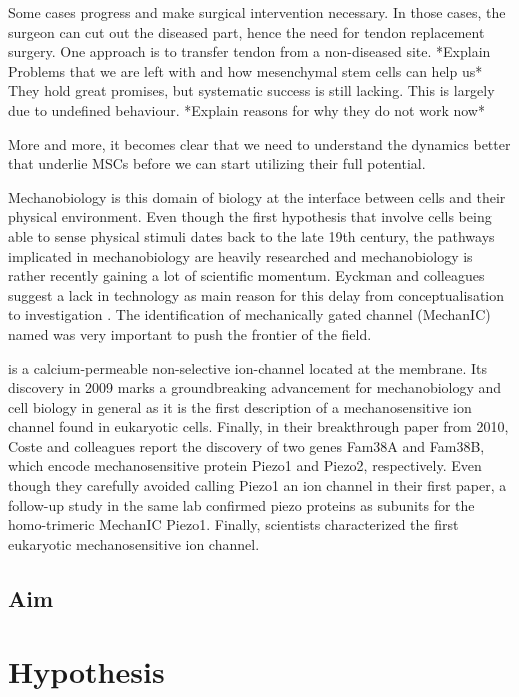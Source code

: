 Some cases progress and make surgical intervention necessary. In those cases, the surgeon can cut out the diseased part, hence the need for tendon replacement surgery.  One approach is to transfer tendon from a non-diseased site. *Explain Problems that we are left with and how mesenchymal stem cells can help us* They hold great promises, but systematic success is still lacking. This is largely due to undefined behaviour. *Explain reasons for why they do not work now* 

More and more, it becomes clear that we need to understand the dynamics better that underlie MSCs before we can start utilizing their full potential.\par 

Mechanobiology is this domain of biology at the interface between cells and their physical environment. 
Even though the first hypothesis that involve cells being able to sense physical stimuli dates back to the late 19th century, the pathways implicated in mechanobiology are heavily researched and mechanobiology is rather recently gaining a lot of scientific momentum. Eyckman and colleagues suggest a lack in technology as main reason for this delay from conceptualisation to investigation \cite{Eyckmans2011}. 
The identification of mechanically gated channel (MechanIC) named \Piezo{} was very important to push the frontier of the field. \par
\Piezo{} is a calcium-permeable non-selective ion-channel located at the membrane. Its discovery in 2009 marks a groundbreaking advancement for mechanobiology and cell biology in general as it is the first description of a mechanosensitive ion channel found in eukaryotic cells.\cite{Coste2010} 
Finally, in their breakthrough paper from 2010, Coste and colleagues report the discovery of two genes Fam38A and Fam38B, which encode mechanosensitive protein Piezo1 and Piezo2, respectively. Even though they carefully avoided calling Piezo1 an ion channel in their first paper, a follow-up study in the same lab confirmed piezo proteins as subunits for the homo-trimeric MechanIC Piezo1. Finally, scientists characterized the first eukaryotic mechanosensitive ion channel. 


\subsection{Aim}


\section{Hypothesis}

